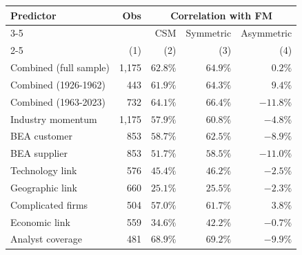 \begin{tabular}{lrrrr}
  \toprule \multirow{2}{*}{Predictor} & \multirow{2}{*}{Obs} & \multicolumn{3}{c}{Correlation with FM} \\
 \cmidrule(l){3-5} & & CSM & Symmetric & Asymmetric \\
 \cmidrule(l){2-5} \vspace{5pt}  & (1) & (2) & (3) & (4) \\ 
  Combined (full sample) & 1,175 & $62.8\%$ & $64.9\%$ & $0.2\%$ \\ 
  Combined (1926-1962) & 443 & $61.9\%$ & $64.3\%$ & $9.4\%$ \\ 
   \vspace{5pt}Combined (1963-2023) & 732 & $64.1\%$ & $66.4\%$ & $-11.8\%$ \\ 
  Industry momentum & 1,175 & $57.9\%$ & $60.8\%$ & $-4.8\%$ \\ 
  BEA customer & 853 & $58.7\%$ & $62.5\%$ & $-8.9\%$ \\ 
  BEA supplier & 853 & $51.7\%$ & $58.5\%$ & $-11.0\%$ \\ 
  Technology link & 576 & $45.4\%$ & $46.2\%$ & $-2.5\%$ \\ 
  Geographic link & 660 & $25.1\%$ & $25.5\%$ & $-2.3\%$ \\ 
  Complicated firms & 504 & $57.0\%$ & $61.7\%$ & $3.8\%$ \\ 
  Economic link & 559 & $34.6\%$ & $42.2\%$ & $-0.7\%$ \\ 
  Analyst coverage & 481 & $68.9\%$ & $69.2\%$ & $-9.9\%$ \\ 
   \bottomrule\end{tabular}
